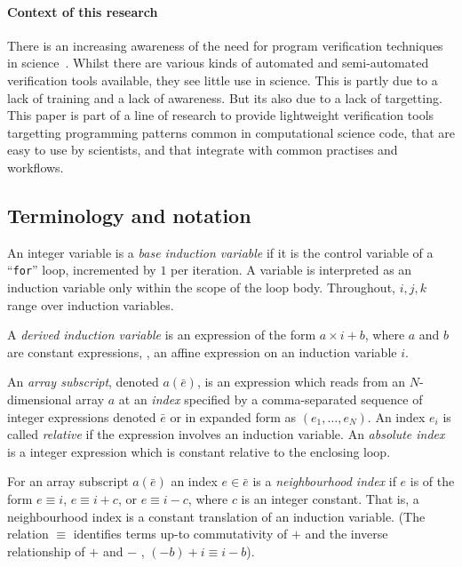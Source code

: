 \paragraph{Context of this research}

There is an increasing awareness of the need for program verification
techniques in
science~\cite{post2005computational,oberkampf2010verification,orchard2014computational}.
Whilst there are various kinds of automated and semi-automated
verification tools available, they see little use in science. This is
partly due to a lack of training and a lack of awareness. But its also
due to a lack of targetting. This paper is part of a line of research
to provide lightweight verification tools targetting
programming patterns common in computational science code, 
that are easy to use by scientists, and that integrate with common
practises and workflows.


\subsection{Terminology and notation}

\begin{defn}
  An integer variable is a \emph{base induction variable} if it is the control
  variable of a ``\texttt{for}'' loop, incremented by $1$ per iteration. A variable
  is interpreted as an induction variable only within the scope of the loop
  body. Throughout, $i, j, k$ range over induction variables.

  A \emph{derived induction variable} is an expression of the form $a \times i
  + b$, where $a$ and $b$ are constant expressions, \ie{}, an affine expression
  on an induction variable $i$.
\end{defn}

\begin{defn}\label{def:array-subs}
  An \emph{array subscript}, denoted $a(\bar{e})$, is an expression which reads
  from an $N$-dimensional array $a$ at an \emph{index} specified by a
  comma-separated sequence of integer expressions denoted $\bar{e}$ or in
  expanded form as $(e_1, \ldots, e_N)$. An index $e_i$ is called
  \emph{relative} if the expression involves an induction variable. An
  \emph{absolute index} is a integer expression which is constant relative to
  the enclosing loop.
\end{defn}

\begin{defn}\label{def:neighbour-ix}
  For an array subscript $a(\bar{e})$ an index $e \in \bar{e}$ is a
  \emph{neighbourhood index} if $e$ is of the form $e \equiv i$, $e \equiv i +
  c$, or $e \equiv i - c$, where $c$ is an integer constant. That is, a
  neighbourhood index is a constant translation of an induction variable. (The
  relation $\equiv$ identifies terms up-to commutativity of $+$ and the inverse
  relationship of $+$ and $-$ \eg{}, $(-b) + i \equiv i - b$).
\end{defn}

